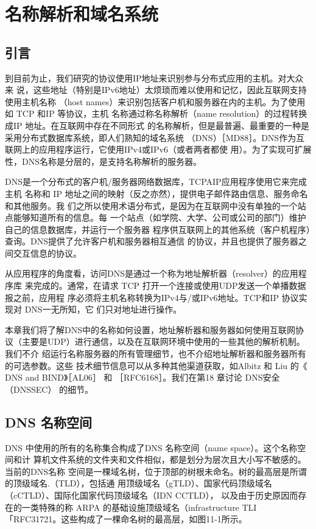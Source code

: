 \chapter{名称解析和域名系统}
\minitoc

\section{引言}

到目前为止，我们研究的协议使用IP地址来识别参与分布式应用的主机。对大众来
说，这些地址（特别是IPv6地址）太烦琐而难以使用和记忆，因此互联网支持使用主机名称
（host names）来识别包括客户机和服务器在内的主机。为了使用如 TCP 和IP 等协议，主机
名称通过称名称解析（name resolution）的过程转换成IP 地址。在互联网中存在不同形式
的名称解析，但是最普遍、最重要的一种是采用分布式数据库系统，即人们熟知的域名系统
（DNS）［MD88］。DNS作为互联网上的应用程序运行，它使用IPv4或IPv6（或者两者都使
用）。为了实现可扩展性，DNS名称是分层的，是支持名称解析的服务器。

DNS是一个分布式的客户机/服务器网络数据库，TCPAIP应用程序使用它来完成主机
名称和 IP 地址之间的映射（反之亦然），提供电子邮件路由信息、服务命名和其他服务。我
们之所以使用术语分布式，是因为在互联网中没有单独的一个站点能够知道所有的信息。每
一个站点（如学院、大学、公司或公司的部门）维护自己的信息数据库，并运行一个服务器
程序供互联网上的其他系统（客户机程序）查询。DNS提供了允许客户机和服务器相互通信
的协议，并且也提供了服务器之间交互信息的协议。

从应用程序的角度看，访问DNS是通过一个称为地址解析器（resolver）的应用程序库
来完成的。通常，在请求 TCP 打开一个连接或使用UDP发送一个单播数据报之前，应用程
序必须将主机名称转换为IPv4与/或IPv6地址。TCP和IP 协议实现对 DNS一无所知，它
们只对地址进行操作。

本章我们将了解DNS中的名称如何设置，地址解析器和服务器如何使用互联网协
议（主要是UDP）进行通信，以及在互联网环境中使用的一些其他的解析机制。我们不介
绍运行名称服务器的所有管理细节，也不介绍地址解析器和服务器所有的可选参数。这些
技术细节信息可以从多种其他渠道获取，如Albitz 和 Liu 的《 DNS and BIND》［AL06］ 和
［RFC6168］。我们在第18 章讨论 DNS安全（DNSSEC） 的细节。

\section{DNS 名称空间}

DNS 中使用的所有的名称集合构成了DNS 名称空间（name space）。这个名称空间和计
算机文件系统的文件夹和文件相似，都是划分为层次且大小写不敏感的。当前的DNS名称
空间是一棵域名树，位于顶部的树根未命名。树的最高层是所谓的顶级域名.（TLD），包括通
用顶级域名（gTLD）、国家代码顶级域名（cCTLD）、国际化国家代码顶级域名（IDN CCTLD），
以及由于历史原因而存在的一类特殊的称 ARPA 的基础设施顶级域名（infrastructure TLI
「RFC31721。这些构成了一棵命名树的最高层，如图11-1所示。

